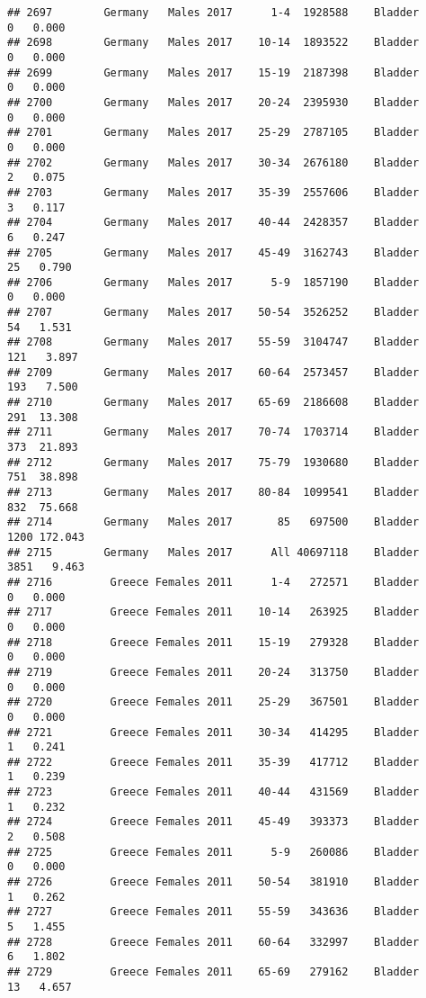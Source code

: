 \documentclass[
]{article}
\begin{document}
\begin{verbatim}
## 2697        Germany   Males 2017      1-4  1928588    Bladder      0   0.000
## 2698        Germany   Males 2017    10-14  1893522    Bladder      0   0.000
## 2699        Germany   Males 2017    15-19  2187398    Bladder      0   0.000
## 2700        Germany   Males 2017    20-24  2395930    Bladder      0   0.000
## 2701        Germany   Males 2017    25-29  2787105    Bladder      0   0.000
## 2702        Germany   Males 2017    30-34  2676180    Bladder      2   0.075
## 2703        Germany   Males 2017    35-39  2557606    Bladder      3   0.117
## 2704        Germany   Males 2017    40-44  2428357    Bladder      6   0.247
## 2705        Germany   Males 2017    45-49  3162743    Bladder     25   0.790
## 2706        Germany   Males 2017      5-9  1857190    Bladder      0   0.000
## 2707        Germany   Males 2017    50-54  3526252    Bladder     54   1.531
## 2708        Germany   Males 2017    55-59  3104747    Bladder    121   3.897
## 2709        Germany   Males 2017    60-64  2573457    Bladder    193   7.500
## 2710        Germany   Males 2017    65-69  2186608    Bladder    291  13.308
## 2711        Germany   Males 2017    70-74  1703714    Bladder    373  21.893
## 2712        Germany   Males 2017    75-79  1930680    Bladder    751  38.898
## 2713        Germany   Males 2017    80-84  1099541    Bladder    832  75.668
## 2714        Germany   Males 2017       85   697500    Bladder   1200 172.043
## 2715        Germany   Males 2017      All 40697118    Bladder   3851   9.463
## 2716         Greece Females 2011      1-4   272571    Bladder      0   0.000
## 2717         Greece Females 2011    10-14   263925    Bladder      0   0.000
## 2718         Greece Females 2011    15-19   279328    Bladder      0   0.000
## 2719         Greece Females 2011    20-24   313750    Bladder      0   0.000
## 2720         Greece Females 2011    25-29   367501    Bladder      0   0.000
## 2721         Greece Females 2011    30-34   414295    Bladder      1   0.241
## 2722         Greece Females 2011    35-39   417712    Bladder      1   0.239
## 2723         Greece Females 2011    40-44   431569    Bladder      1   0.232
## 2724         Greece Females 2011    45-49   393373    Bladder      2   0.508
## 2725         Greece Females 2011      5-9   260086    Bladder      0   0.000
## 2726         Greece Females 2011    50-54   381910    Bladder      1   0.262
## 2727         Greece Females 2011    55-59   343636    Bladder      5   1.455
## 2728         Greece Females 2011    60-64   332997    Bladder      6   1.802
## 2729         Greece Females 2011    65-69   279162    Bladder     13   4.657

\end{verbatim}
\end{document}
